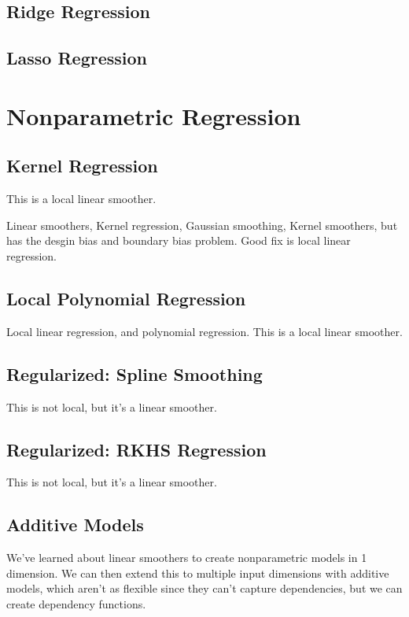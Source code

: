 \documentclass{article}
\begin{document}
  \subsection{Ridge Regression} 

  \subsection{Lasso Regression}

\section{Nonparametric Regression}

  \subsection{Kernel Regression}
    
    This is a local linear smoother. 

    Linear smoothers, Kernel regression, Gaussian smoothing, Kernel smoothers, but has the desgin bias and boundary bias problem. Good fix is local linear regression. 

  \subsection{Local Polynomial Regression}

    Local linear regression, and polynomial regression. This is a local linear smoother. 

  \subsection{Regularized: Spline Smoothing}

    This is not local, but it's a linear smoother. 

  \subsection{Regularized: RKHS Regression}

    This is not local, but it's a linear smoother. 

  \subsection{Additive Models}
  
    We've learned about linear smoothers to create nonparametric models in 1 dimension. We can then extend this to multiple input dimensions with additive models, which aren't as flexible since they can't capture dependencies, but we can create dependency functions. 
\end{document}
